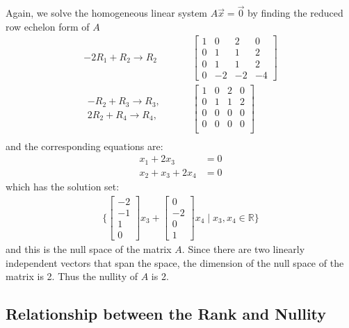 \begin{example}
Again, we solve the homogeneous linear system $A \vec{x} = \vec{0}$ by finding the reduced row echelon form of $A$
%
\begin{align*}
-2R_1 + R_2 \rightarrow R_2 & \qquad
\begin{bmatrix}
1 & 0 & 2 & 0 \\
0 & 1 & 1 & 2 \\
0 & 1 & 1 & 2 \\
0 & -2 & -2 & -4 
\end{bmatrix} \\
\begin{array}{r}
-R_2 + R_3 \rightarrow R_3, \\
2R_2 + R_4 \rightarrow R_4, 
\end{array} & \qquad 
\begin{bmatrix}
1 & 0 & 2 & 0 \\
0 & 1 & 1 & 2 \\
0 & 0 & 0 & 0 \\
0 & 0 & 0 & 0 \\
\end{bmatrix} \\
\end{align*}
and the corresponding equations are:
%
\begin{align*}
x_1 + 2 x_3 & = 0 \\
x_2 + x_3 + 2x_4 & = 0 
\end{align*}
which has the solution set:
%
\begin{align*}
 \{ \begin{bmatrix}
 -2 \\ -1 \\ 1 \\ 0 
 \end{bmatrix} x_3 + \begin{bmatrix}
 0 \\ -2 \\ 0 \\ 1 
 \end{bmatrix} x_4  \; | \; x_3, x_4 \in \mathbb{R} \}
\end{align*}
and this is the null space of the matrix $A$.  Since there are two linearly independent vectors that span the space, the dimension of the null space of the matrix is 2.  Thus the nullity of $A$ is 2.   
\end{example}

\subsection{Relationship between the Rank and Nullity}

